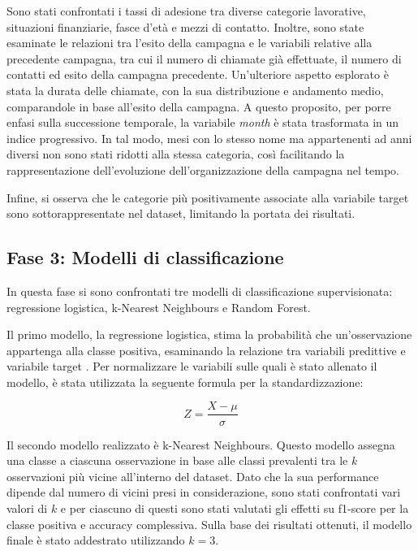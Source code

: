 \documentclass[11,5pt, a4paper]{article}
\begin{document}
Sono stati confrontati i tassi di adesione tra diverse categorie lavorative, situazioni finanziarie, fasce d'età e mezzi di contatto. Inoltre, sono state esaminate le relazioni tra l'esito della campagna e le variabili relative alla precedente campagna, tra cui il numero di chiamate già effettuate, il numero di contatti ed esito della campagna precedente. Un'ulteriore aspetto esplorato è stata la durata delle chiamate, con la sua distribuzione e andamento medio, comparandole in base all'esito della campagna. 
A questo proposito, per porre enfasi sulla successione temporale, la variabile \textit{month} è stata trasformata in un indice progressivo. In tal modo, mesi con lo stesso nome ma appartenenti ad anni diversi non sono stati ridotti alla stessa categoria, così facilitando la rappresentazione dell'evoluzione dell'organizzazione della campagna nel tempo.

Infine, si osserva che le categorie più positivamente associate alla variabile target sono sottorappresentate nel dataset, limitando la portata dei risultati.

\subsection{Fase 3: Modelli di classificazione}
\label{ss: Fase 3}
In questa fase si sono confrontati tre modelli di classificazione supervisionata: regressione logistica, k-Nearest Neighbours e Random Forest.

Il primo modello, la regressione logistica, stima la probabilit\`{a} che un'osservazione appartenga alla classe positiva, esaminando la relazione tra variabili predittive e variabile target \citep{REGLOG_IBM}. Per normalizzare le variabili sulle quali \`{e} stato allenato il modello, \`{e} stata utilizzata la seguente formula per la standardizzazione:

\begin{equation*}
    Z = \frac{X-\mu}{\sigma}
\end{equation*}
\vspace{0.22em}

Il secondo modello realizzato è k-Nearest Neighbours. Questo modello assegna una classe a ciascuna osservazione in base alle classi prevalenti tra le $k$ osservazioni più vicine all'interno del dataset. Dato che la sua performance dipende dal numero di vicini presi in considerazione, sono stati confrontati vari valori di $k$ e per ciascuno di questi sono stati valutati gli effetti su f1-score per la classe positiva e accuracy complessiva. Sulla base dei risultati ottenuti, il modello finale è stato addestrato utilizzando $k=3$.
\end{document}
